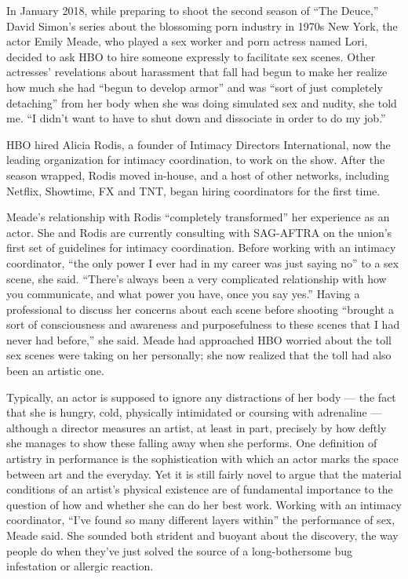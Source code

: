 In January 2018, while preparing to shoot the second season of ``The
Deuce,'' David Simon's series about the blossoming porn industry in
1970s New York, the actor Emily Meade, who played a sex worker and porn
actress named Lori, decided to ask HBO to hire someone expressly to
facilitate sex scenes. Other actresses' revelations about harassment
that fall had begun to make her realize how much she had ``begun to
develop armor'' and was ``sort of just completely detaching'' from her
body when she was doing simulated sex and nudity, she told me. ``I
didn't want to have to shut down and dissociate in order to do my job.''

HBO hired Alicia Rodis, a founder of Intimacy Directors International,
now the leading organization for intimacy coordination, to work on the
show. After the season wrapped, Rodis moved in-house, and a host of
other networks, including Netflix, Showtime, FX and TNT, began hiring
coordinators for the first time.

Meade's relationship with Rodis ``completely transformed'' her
experience as an actor. She and Rodis are currently consulting with
SAG-AFTRA on the union's first set of guidelines for intimacy
coordination. Before working with an intimacy coordinator, ``the only
power I ever had in my career was just saying no'' to a sex scene, she
said. ``There's always been a very complicated relationship with how you
communicate, and what power you have, once you say yes.'' Having a
professional to discuss her concerns about each scene before shooting
``brought a sort of consciousness and awareness and purposefulness to
these scenes that I had never had before,'' she said. Meade had
approached HBO worried about the toll sex scenes were taking on her
personally; she now realized that the toll had also been an artistic
one.

Typically, an actor is supposed to ignore any distractions of her body
--- the fact that she is hungry, cold, physically intimidated or
coursing with adrenaline --- although a director measures an artist, at
least in part, precisely by how deftly she manages to show these falling
away when she performs. One definition of artistry in performance is the
sophistication with which an actor marks the space between art and the
everyday. Yet it is still fairly novel to argue that the material
conditions of an artist's physical existence are of fundamental
importance to the question of how and whether she can do her best work.
Working with an intimacy coordinator, ``I've found so many different
layers within'' the performance of sex, Meade said. She sounded both
strident and buoyant about the discovery, the way people do when they've
just solved the source of a long-bothersome bug infestation or allergic
reaction.

